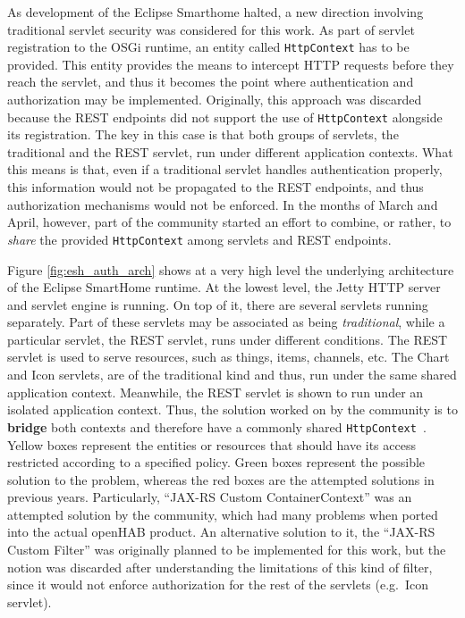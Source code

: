 \documentclass[12pt]{article}
\begin{document}
As development of the Eclipse Smarthome halted, a new direction involving traditional servlet security was considered for this work. As part of servlet registration to the OSGi runtime, an entity called \texttt{HttpContext} has to be provided. This entity provides the means to intercept HTTP requests before they reach the servlet, and thus it becomes the point where authentication and authorization may be implemented. Originally, this approach was discarded because the REST endpoints did not support the use of \texttt{HttpContext} alongside its registration. The key in this case is that both groups of servlets, the traditional and the REST servlet, run under different application contexts. What this means is that, even if a traditional servlet handles authentication properly, this information would not be propagated to the REST endpoints, and thus authorization mechanisms would not be enforced. In the months of March and April, however, part of the community started an effort to combine, or rather, to \emph{share} the provided \texttt{HttpContext} among servlets and REST endpoints.

Figure \ref{fig:esh_auth_arch} shows at a very high level the underlying architecture of the Eclipse SmartHome runtime. At the lowest level, the Jetty HTTP server and servlet engine is running. On top of it, there are several servlets running separately. Part of these servlets may be associated as being \emph{traditional}, while a particular servlet, the REST servlet, runs under different conditions. The REST servlet is used to serve resources, such as things, items, channels, etc. The Chart and Icon servlets, are of the traditional kind and thus, run under the same shared application context. Meanwhile, the REST servlet is shown to run under an isolated application context. Thus, the solution worked on by the community is to \textbf{bridge} both contexts and therefore have a commonly shared \texttt{HttpContext}~\cite{esh_03}. Yellow boxes represent the entities or resources that should have its access restricted according to a specified policy. Green boxes represent the possible solution to the problem, whereas the red boxes are the attempted solutions in previous years. Particularly, ``JAX-RS Custom ContainerContext'' was an attempted solution by the community, which had many problems when ported into the actual openHAB product. An alternative solution to it, the ``JAX-RS Custom Filter'' was originally planned to be implemented for this work, but the notion was discarded after understanding the limitations of this kind of filter, since it would not enforce authorization for the rest of the servlets (e.g.\ Icon servlet). 
\end{document}
